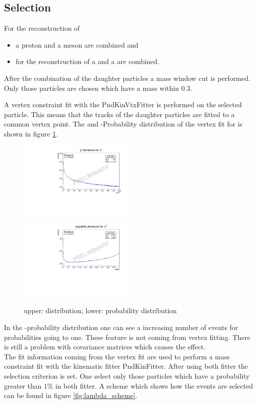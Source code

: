 	\subsection*{Selection}
		For the reconstruction of 
		
		\begin{itemize}
			\item \lam a proton and a \piminus meson are combined and
			\item for the reconstruction of \alam a \antiproton and a \piplus are combined.
		\end{itemize}
		 
		After the combination of the daughter particles a mass window cut is performed.
		Only those particles are chosen which have a mass within $0.3$\massunit.
		
		
		A vertex constraint fit with the PndKinVtxFitter is performed on the selected particle.
		This means that the tracks of the daughter particles are fitted to a common vertex point.  
		The \chisq and \chisq-Probability distribution of the vertex fit for \lam is shown in figure \ref{fig:lambda_chi2}.
		
		\begin{figure}
			\centering
				\includegraphics[width=0.50\textwidth]{./plots/lambda0/lambda0_chisqrt.pdf}
				\includegraphics [width=0.50\textwidth]{./plots/lambda0/lambda0_prob.pdf}
			\caption{upper: \chisq distribution; lower: \chisq probability distribution}
			\label{fig:lambda_chi2}
		\end{figure}
		
		In the \chisq-probability distribution one can see a increasing number of events for probabilities going to one.
		These feature is not coming from vertex fitting.
		There is still a problem with covariance matrices which causes the effect.
		\vspace{11pt}\\
		The fit information coming from the vertex fit are used to perform a mass constraint fit with the kinematic fitter PndKinFitter.
		After using both fitter the selection criterion is set. 
		One select only those particles which have a probability greater than $1\%$ in both fitter.
		A scheme which shows how the events are selected can be found in figure \ref{fig:lambda_scheme}. 
		
